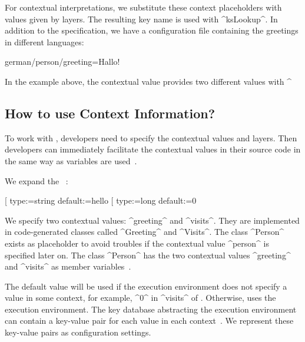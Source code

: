 For contextual interpretations, we substitute these context placeholders with values given by layers.
The resulting key name is used with ^ksLookup^.
In addition to the specification, we have a configuration file containing the greetings in different languages:

\begin{code}[language=CfgElektra]
german/person/greeting=Hallo!
\end{code}

In the example above, the contextual value provides two different values with ^%

\subsection{How to use Context Information?}

To work with \elektra{}, developers need to specify the contextual values and layers.
Then developers can immediately facilitate the contextual values in their source code in the same way as variables are used~\cite{raab2014program}.

\begin{example}
\label{ex:contextual-value-greeting}
We expand the ~\cite{raab2014program}:

\begin{code}
[%
  type:=string
  default:=hello
[%
  type:=long
  default:=0
\end{code}

We specify two contextual values: ^greeting^ and ^visits^.
They are implemented in code-generated classes called ^Greeting^ and ^Visits^.
The class ^Person^ exists as placeholder to avoid troubles if the contextual value ^person^ is specified later on.
The class ^Person^ has the two contextual values ^greeting^ and ^visits^ as member variables~\cite{raab2014program}.
\end{example}

The default value will be used if the execution environment does not specify a value in some context, for example, ^0^ in ^visits^ of .
Otherwise, \elektra{} uses the execution environment.
The key database abstracting the execution environment can contain a key-value pair for each value in each context~\cite{raab2014program}.
We represent these key-value pairs as configuration settings.

